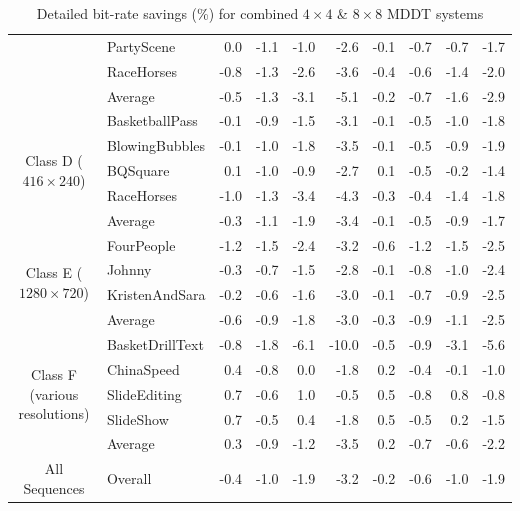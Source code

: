 \documentclass[11pt,a4paper,openright,twoside]{book}
\numberwithin{equation}{section} %
\numberwithin{figure}{section} %
\numberwithin{table}{section} %
\begin{document}
\begin{table}[tb]
\begin{tabularx}{\textwidth}{c|X|rr|rr|rr|rr}
		& PartyScene           & 0.0  & -1.1 & -1.0 & -2.6  & -0.1 & -0.7 & -0.7 & -1.7 \\
		& RaceHorses           & -0.8 & -1.3 & -2.6 & -3.6  & -0.4 & -0.6 & -1.4 & -2.0 \\
		\cline{2-10}
		& Average              & -0.5 & -1.3 & -3.1 & -5.1  & -0.2 & -0.7 & -1.6 & -2.9 \\
		\hline\hline
		\multirow{5}{0.10\textwidth}{\centering Class D ($416\times240$)}
		& BasketballPass       & -0.1 & -0.9 & -1.5 & -3.1  & -0.1 & -0.5 & -1.0 & -1.8 \\
		& BlowingBubbles       & -0.1 & -1.0 & -1.8 & -3.5  & -0.1 & -0.5 & -0.9 & -1.9 \\
		& BQSquare             & 0.1  & -1.0 & -0.9 & -2.7  & 0.1  & -0.5 & -0.2 & -1.4 \\
		& RaceHorses           & -1.0 & -1.3 & -3.4 & -4.3  & -0.3 & -0.4 & -1.4 & -1.8 \\
		\cline{2-10}
		& Average              & -0.3 & -1.1 & -1.9 & -3.4  & -0.1 & -0.5 & -0.9 & -1.7 \\
		\hline\hline
		\multirow{4}{0.10\textwidth}{\centering Class E ($1280\times720$)}
		& FourPeople           & -1.2 & -1.5 & -2.4 & -3.2  & -0.6 & -1.2 & -1.5 & -2.5 \\
		& Johnny               & -0.3 & -0.7 & -1.5 & -2.8  & -0.1 & -0.8 & -1.0 & -2.4 \\    
		& KristenAndSara       & -0.2 & -0.6 & -1.6 & -3.0  & -0.1 & -0.7 & -0.9 & -2.5 \\
		\cline{2-10}
		& Average              & -0.6 & -0.9 & -1.8 & -3.0  & -0.3 & -0.9 & -1.1 & -2.5 \\
		\hline\hline
		\multirow{5}{0.10\textwidth}{\centering Class F (various resolutions)}
		& BasketDrillText      & -0.8 & -1.8 & -6.1 & -10.0 & -0.5 & -0.9 & -3.1 & -5.6 \\
		& ChinaSpeed           & 0.4  & -0.8 & 0.0  & -1.8  & 0.2  & -0.4 & -0.1 & -1.0 \\
		& SlideEditing         & 0.7  & -0.6 & 1.0  & -0.5  & 0.5  & -0.8 & 0.8  & -0.8 \\
		& SlideShow            & 0.7  & -0.5 & 0.4  & -1.8  & 0.5  & -0.5 & 0.2  & -1.5 \\
		\cline{2-10}
		& Average              & 0.3  & -0.9 & -1.2 & -3.5  & 0.2  & -0.7 & -0.6 & -2.2 \\
		\hline\hline
		All Sequences
		& Overall          & -0.4 & -1.0 & -1.9 & -3.2  & -0.2 & -0.6 & -1.0 & -1.9 \\
	\end{tabularx}
	\caption{Detailed bit-rate savings (\%) for combined $4\times4$ \& $8\times8$
	\acs{MDDT} systems}
	\label{tab:detailed_mddt_bd_rate}
\end{table}
\end{document}
